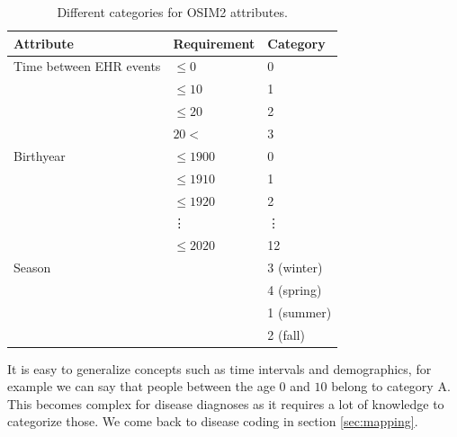 \begin{table}[!htb]
\centering
\begin{tabular}{lll}
\hline
Attribute                                    & Requirement                      & Category \\ \hline
\multicolumn{1}{l|}{Time between EHR events} & \multicolumn{1}{l|}{$\leq 0$}    & 0        \\
\multicolumn{1}{l|}{}                        & \multicolumn{1}{l|}{$\leq 10$}   & 1        \\
\multicolumn{1}{l|}{}                        & \multicolumn{1}{l|}{$\leq 20$}   & 2        \\
\multicolumn{1}{l|}{}                        & \multicolumn{1}{l|}{$20 <$}      & 3        \\ \hline
\multicolumn{1}{l|}{Birthyear}               & \multicolumn{1}{l|}{$\leq 1900$} & 0        \\
\multicolumn{1}{l|}{}                        & \multicolumn{1}{l|}{$\leq 1910$} & 1        \\
\multicolumn{1}{l|}{}                        & \multicolumn{1}{l|}{$\leq 1920$} & 2        \\
\multicolumn{1}{l|}{}                        & \multicolumn{1}{l|}{\vdots}      & \vdots   \\
\multicolumn{1}{l|}{}                        & \multicolumn{1}{l|}{$\leq 2020$} & 12       \\ \hline
\multicolumn{1}{l|}{Season}                  & \multicolumn{1}{l|}{}            & 3 (winter) \\
\multicolumn{1}{l|}{}                        & \multicolumn{1}{l|}{}            & 4 (spring)   \\
\multicolumn{1}{l|}{}                        & \multicolumn{1}{l|}{}            & 1 (summer)   \\
\multicolumn{1}{l|}{}                        & \multicolumn{1}{l|}{}            & 2 (fall)    \\ \hline
\end{tabular}

\caption{Different categories for OSIM2 attributes.}
\label{tab:catOsim}
\end{table}

It is easy to generalize concepts such as time intervals and demographics, for example we can say that people between the age $0$ and $10$ belong to category A. This becomes complex for disease diagnoses as it requires a lot of knowledge to categorize those. We come back to disease coding in section \ref{sec:mapping}. \\

